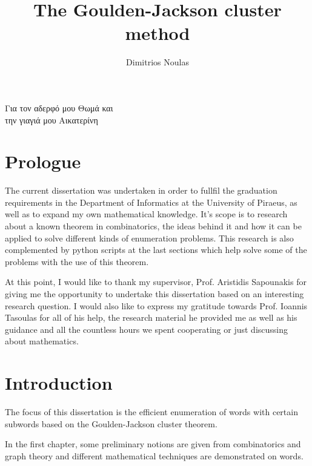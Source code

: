 \documentclass[12pt]{report}
\newenvironment{dedication}
  {%
   \thispagestyle{empty}%
   \vspace*{\stretch{1}}%
   \itshape             %
   \raggedleft          %
  }
  {\par %
   \vspace{\stretch{3}} %
   \clearpage           %
  }
\begin{document}
\title{The Goulden-Jackson cluster method}

\author{Dimitrios Noulas}

\maketitle

\begin{dedication}
    
    \par   %


    \vspace{\baselineskip}
    \textgreek{Για τον αδερφό μου Θωμά και}\\
    \textgreek{την γιαγιά μου Αικατερίνη}
  \end{dedication}

\chapter*{Prologue}

The current dissertation was undertaken in order to fullfil the graduation requirements in the Department of Informatics at the University of Piraeus, as well as to expand my own mathematical knowledge. It's scope is to research about a known theorem in combinatorics, the ideas behind it and how it can be applied to solve different kinds of enumeration problems. This research is also complemented by python scripts at the last sections which help solve some of the problems with the use of this theorem.

At this point, I would like to thank my supervisor, Prof. Aristidis Sapounakis for giving me the opportunity to undertake this dissertation based on an interesting research question. I would also like to express my gratitude towards Prof. Ioannis Tasoulas for all of his help, the research material he provided me as well as his guidance and all the countless hours we spent cooperating or just discussing about mathematics.

\chapter*{Introduction}

The focus of this dissertation is the efficient enumeration of words with certain subwords based on the Goulden-Jackson cluster theorem.

In the first chapter, some preliminary notions are given from combinatorics and graph theory and different mathematical techniques are demonstrated on words.
\end{document}
